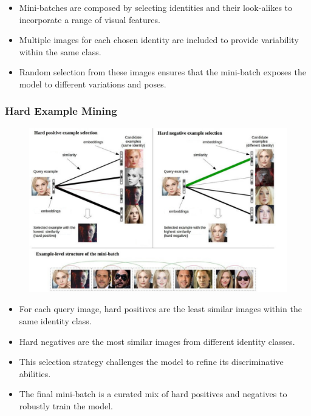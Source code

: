 \begin{itemize}
    \item Mini-batches are composed by selecting identities and their look-alikes to incorporate a range of visual features.
    \item Multiple images for each chosen identity are included to provide variability within the same class.
    \item Random selection from these images ensures that the mini-batch exposes the model to different variations and poses.
\end{itemize}




\subsubsection*{Hard Example Mining}
\begin{figure}[H]
    \centering
    \includegraphics[width=1\linewidth]{img/hardpos_negmin2.png}
\end{figure}


\begin{itemize}
    \item For each query image, hard positives are the least similar images within the same identity class.
    \item Hard negatives are the most similar images from different identity classes.
    \item This selection strategy challenges the model to refine its discriminative abilities.
    \item The final mini-batch is a curated mix of hard positives and negatives to robustly train the model.
\end{itemize}

